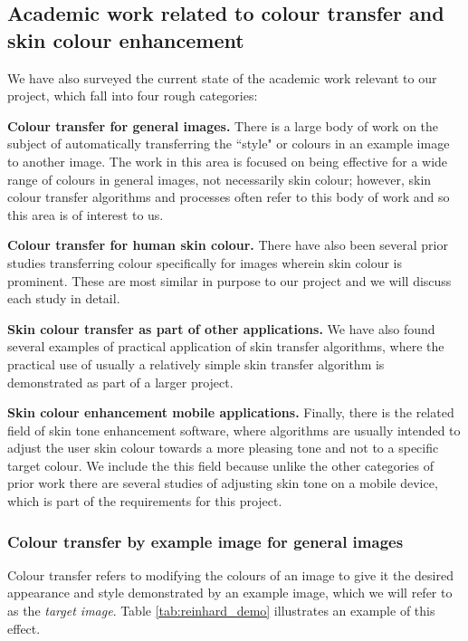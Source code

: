 

\subsection{Academic work related to colour transfer and skin colour enhancement \label{sec:academic_work}}

We have also surveyed the current state of the academic work relevant to our project, which fall into four rough categories:

\textbf{Colour transfer for general images.} There is a large body of work on the subject of automatically transferring the ``style" or colours in an example image to another image. The work in this area is focused on being effective for a wide range of colours in general images, not necessarily skin colour; however, skin colour transfer algorithms and processes often refer to this body of work and so this area is of interest to us.

\textbf{Colour transfer for human skin colour.} There have also been several prior studies transferring colour specifically for images wherein skin colour is prominent. These are most similar in purpose to our project and we will discuss each study in detail.

\textbf{Skin colour transfer as part of other applications.} We have also found several examples of practical application of skin transfer algorithms, where the practical use of usually a relatively simple skin transfer algorithm is demonstrated as part of a larger project. 

\textbf{Skin colour enhancement mobile applications.} Finally, there is the related field of skin tone enhancement software, where algorithms are usually intended to adjust the user skin colour towards a more pleasing tone and not to a specific target colour. We include the this field because unlike the other categories of prior work there are several studies of adjusting skin tone on a mobile device, which is part of the requirements for this project.

\subsubsection{Colour transfer by example image for general images}
Colour transfer refers to modifying the colours of an image to give it the desired appearance and style demonstrated by an example image, which we will refer to as the \textit{target image}. Table \ref{tab:reinhard_demo} illustrates an example of this effect.

